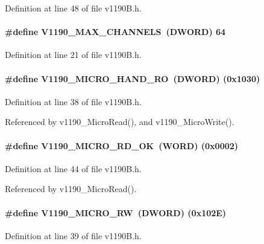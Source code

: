 Definition at line 48 of file v1190B.h.
\paragraph[{V1190\_\-MAX\_\-CHANNELS}]{\setlength{\rightskip}{0pt plus 5cm}\#define V1190\_\-MAX\_\-CHANNELS~({\bf DWORD}) 64}\hfill\label{v1190B_8h_ac216727275eb6c06c5ca02af8485fc32}


Definition at line 21 of file v1190B.h.
\paragraph[{V1190\_\-MICRO\_\-HAND\_\-RO}]{\setlength{\rightskip}{0pt plus 5cm}\#define V1190\_\-MICRO\_\-HAND\_\-RO~({\bf DWORD}) (0x1030)}\hfill\label{v1190B_8h_a5cf81e65ef78f622fe36fc1f82965f26}


Definition at line 38 of file v1190B.h.

Referenced by v1190\_\-MicroRead(), and v1190\_\-MicroWrite().
\paragraph[{V1190\_\-MICRO\_\-RD\_\-OK}]{\setlength{\rightskip}{0pt plus 5cm}\#define V1190\_\-MICRO\_\-RD\_\-OK~({\bf WORD}) (0x0002)}\hfill\label{v1190B_8h_a2e64cb8b0ec7bc7c5efbba726da5c81e}


Definition at line 44 of file v1190B.h.

Referenced by v1190\_\-MicroRead().
\paragraph[{V1190\_\-MICRO\_\-RW}]{\setlength{\rightskip}{0pt plus 5cm}\#define V1190\_\-MICRO\_\-RW~({\bf DWORD}) (0x102E)}\hfill\label{v1190B_8h_a3e028e9b35a6fad87c84101cf13f165d}


Definition at line 39 of file v1190B.h.

